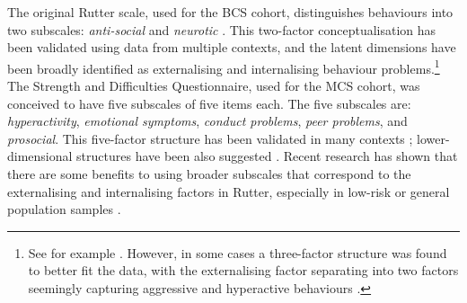 The original Rutter scale, used for the BCS cohort, distinguishes behaviours into two subscales: \emph{anti-social} and \emph{neurotic} \citep{Rutter1970}. This two-factor conceptualisation has been validated using data from multiple contexts, and the latent dimensions have been broadly identified as externalising and internalising behaviour problems.\footnote{See for example \citet{Fowler1979,Venables1983,Tremblay1987,Berglund1999,Klein2009}. However, in some cases a three-factor structure was found to better fit the data, with the externalising factor separating into two factors seemingly capturing aggressive and hyperactive behaviours \citep{Behar1974,McGee1985}.} The Strength and Difficulties Questionnaire, used for the MCS cohort, was conceived to have five subscales of five items each. The five subscales are: \emph{hyperactivity}, \emph{emotional symptoms}, \emph{conduct problems}, \emph{peer problems}, and \emph{prosocial}. This five-factor structure has been validated in many contexts \citep{Stone2010}; lower-dimensional structures have been also suggested \citep{Dickey2004}. Recent research has shown that there are some benefits to using broader subscales that correspond to the externalising and internalising factors in Rutter, especially in low-risk or general population samples \citep{Goodman2010}.

